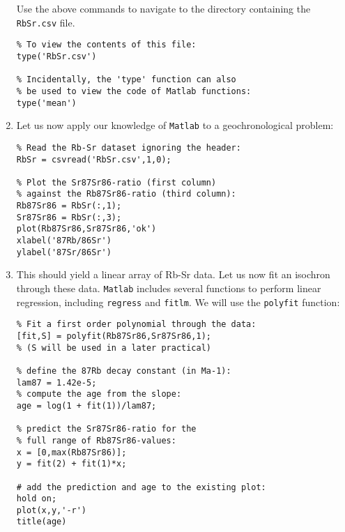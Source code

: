 \begin{enumerate}
Use the above commands to navigate to the directory containing the
\texttt{RbSr.csv} file.

\begin{verbatim}
% To view the contents of this file:
type('RbSr.csv')

% Incidentally, the 'type' function can also 
% be used to view the code of Matlab functions:
type('mean')
\end{verbatim}

\item Let us now apply our knowledge of \texttt{Matlab} to a
  geochronological problem:

\begin{verbatim}
% Read the Rb-Sr dataset ignoring the header:
RbSr = csvread('RbSr.csv',1,0);

% Plot the Sr87Sr86-ratio (first column)
% against the Rb87Sr86-ratio (third column):
Rb87Sr86 = RbSr(:,1);
Sr87Sr86 = RbSr(:,3);
plot(Rb87Sr86,Sr87Sr86,'ok')
xlabel('87Rb/86Sr')
ylabel('87Sr/86Sr')
\end{verbatim}

\item This should yield a linear array of Rb-Sr data. Let us now fit
  an isochron through these data. \texttt{Matlab} includes several
  functions to perform linear regression, including \texttt{regress}
  and \texttt{fitlm}. We will use the \texttt{polyfit} function:

\begin{verbatim}
% Fit a first order polynomial through the data:
[fit,S] = polyfit(Rb87Sr86,Sr87Sr86,1);
% (S will be used in a later practical)

% define the 87Rb decay constant (in Ma-1):
lam87 = 1.42e-5;
% compute the age from the slope:
age = log(1 + fit(1))/lam87;

% predict the Sr87Sr86-ratio for the
% full range of Rb87Sr86-values:
x = [0,max(Rb87Sr86)];
y = fit(2) + fit(1)*x;

# add the prediction and age to the existing plot:
hold on;
plot(x,y,'-r')
title(age)
\end{verbatim}

\end{enumerate}

